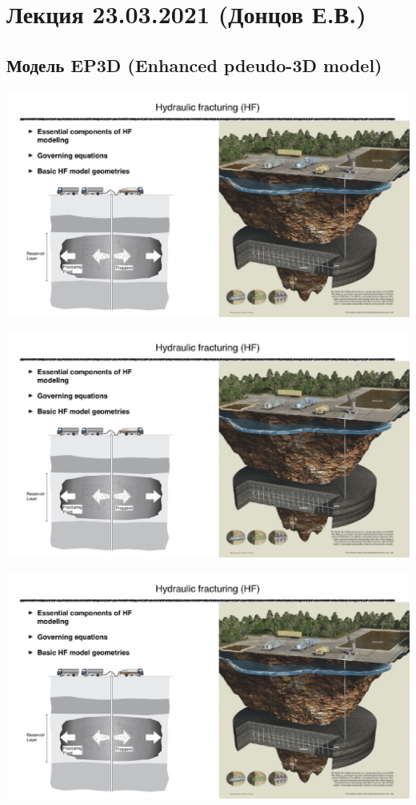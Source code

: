 \documentclass[main.tex]{subfiles}
\begin{document}

\section{Лекция 23.03.2021 (Донцов Е.В.)}

\subsection{Модель EP3D (Enhanced pdeudo-3D model)}

\includegraphics[width=\textwidth, page=73]{HF_slides.pdf}

\includegraphics[width=\textwidth, page=74]{HF_slides.pdf}

\includegraphics[width=\textwidth, page=75]{HF_slides.pdf}
\end{document}
